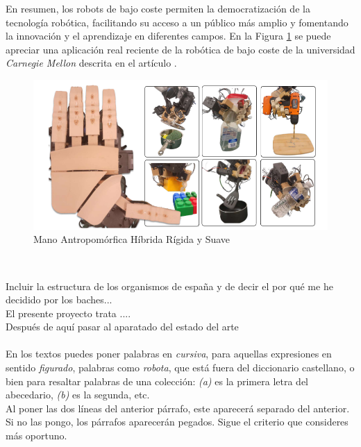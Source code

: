 En resumen, los robots de bajo coste permiten la democratización de la tecnología robótica, facilitando su acceso a un público más amplio y fomentando la innovación y el aprendizaje en diferentes campos. En la Figura \ref{fig:roblowcost} se puede apreciar una aplicación real reciente de la robótica de bajo coste de la universidad \textit{Carnegie Mellon} descrita en el artículo \cite{shaw2024leap}.\\ 

\begin{figure} [h!]
	\begin{center}
		\includegraphics[width=16cm]{figs/handlowcost.png}
	\end{center}
	\caption{Mano Antropomórfica Híbrida Rígida y Suave} %
	\label{fig:roblowcost}
\end{figure}\


Incluir la estructura de los organismos de españa y de decir el por qué me he decidido por  los baches... \\

El presente proyecto trata ....\\


Después de aquí pasar al aparatado del estado del arte \\\\

En los textos puedes poner palabras en \textit{cursiva}, para aquellas expresiones en sentido \textit{figurado}, palabras como \textit{robota}, que está fuera del diccionario castellano, o bien para resaltar palabras de una colección: \textit{(a)} es la primera letra del abecedario, \textit{(b)} es la segunda, etc.\\

Al poner las dos líneas del anterior párrafo, este aparecerá separado del anterior. Si no las pongo, los párrafos aparecerán pegados. Sigue el criterio que consideres más oportuno.

